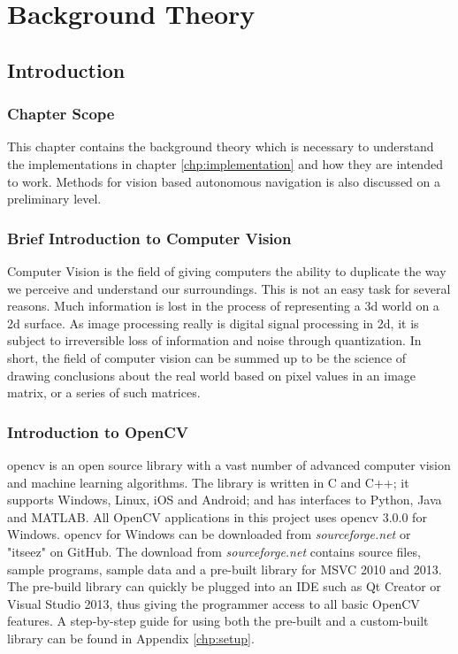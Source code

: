 \chapter{Background Theory}\label{chp:theory}

\section{Introduction}

\subsection{Chapter Scope}
This chapter contains the background theory which is necessary to understand the implementations in chapter \ref{chp:implementation} and how they are intended to work. Methods for vision based autonomous navigation is also discussed on a preliminary level. 

\subsection{Brief Introduction to Computer Vision}
Computer Vision is the field of giving computers the ability to duplicate the way we perceive and understand our surroundings. This is not an easy task for several reasons. Much information is lost in the process of representing a 3d world on a 2d surface. As image processing really is digital signal processing in 2d, it is subject to irreversible loss of information and noise through quantization. In short, the field of computer vision can be summed up to be the science of drawing conclusions about the real world based on pixel values in an image matrix, or a series of such matrices.

\subsection{Introduction to OpenCV}

\gls{opencv} is an  open source library with a vast number of advanced computer vision and machine learning algorithms. The library is written in C and C++; it supports Windows, Linux, iOS and Android; and has interfaces to Python, Java and MATLAB. All OpenCV applications in this project uses \gls{opencv} 3.0.0 for Windows. \gls{opencv} for Windows can be downloaded from \textit{sourceforge.net} or "itseez" on GitHub. The download from \textit{sourceforge.net} contains source files, sample programs, sample data and a pre-built library for MSVC 2010 and 2013. The pre-build library can quickly be plugged into  an IDE such as Qt Creator or Visual Studio 2013, thus giving the programmer access to all basic OpenCV features. A step-by-step guide for using both the pre-built and a custom-built library can be found in Appendix \ref{chp:setup}.

